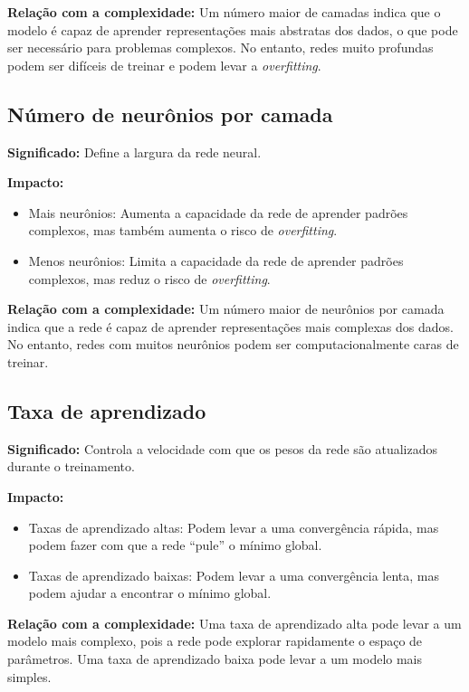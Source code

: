 \documentclass[12pt,a4paper,oneside,openany]{article}
\begin{document}
\noindent\textbf{Relação com a complexidade:}  
Um número maior de camadas indica que o modelo é capaz de aprender representações mais abstratas dos dados, o que pode ser necessário para problemas complexos. No entanto, redes muito profundas podem ser difíceis de treinar e podem levar a \textit{overfitting}.

\subsection*{Número de neurônios por camada}
\noindent\textbf{Significado:} Define a largura da rede neural.  

\noindent\textbf{Impacto:}
\begin{itemize}
    \item Mais neurônios: Aumenta a capacidade da rede de aprender padrões complexos, mas também aumenta o risco de \textit{overfitting}.
    \item Menos neurônios: Limita a capacidade da rede de aprender padrões complexos, mas reduz o risco de \textit{overfitting}.
\end{itemize}

\noindent\textbf{Relação com a complexidade:}  
Um número maior de neurônios por camada indica que a rede é capaz de aprender representações mais complexas dos dados. No entanto, redes com muitos neurônios podem ser computacionalmente caras de treinar.

\subsection*{Taxa de aprendizado}
\textbf{Significado:} Controla a velocidade com que os pesos da rede são atualizados durante o treinamento.  

\noindent\textbf{Impacto:}
\begin{itemize}
    \item Taxas de aprendizado altas: Podem levar a uma convergência rápida, mas podem fazer com que a rede ``pule'' o mínimo global.
    \item Taxas de aprendizado baixas: Podem levar a uma convergência lenta, mas podem ajudar a encontrar o mínimo global.
\end{itemize}

\noindent\textbf{Relação com a complexidade:}  
Uma taxa de aprendizado alta pode levar a um modelo mais complexo, pois a rede pode explorar rapidamente o espaço de parâmetros. Uma taxa de aprendizado baixa pode levar a um modelo mais simples.
\end{document}
